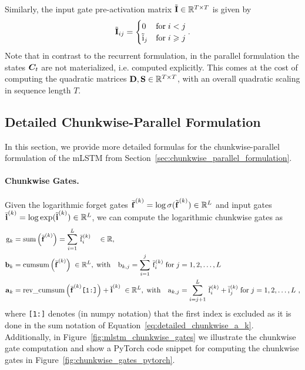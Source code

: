 \documentclass{article}
\begin{document}
    Similarly, the input gate pre-activation matrix $\tilde{\bm{\mathrm{I}}} \in \mathbb{R}^{T \times T}$ is given by
    \begin{equation}
        \tilde{\bm{\rI}}_{ij} = \begin{cases}
            0             & \text{for} \; i < j    \\ %
            \tilde{\Ri}_j & \text{for} \; i \geq j %
        \end{cases}.
    \end{equation}
    Note that in contrast to the recurrent formulation, in the parallel formulation the states $\bm{C}_{t}$ are not materialized, i.e. computed explicitly.
    This comes at the cost of computing the quadratic matrices $\bm{\mathrm{D}}, \bm{\mathrm{S}} \in \mathbb{R}^{T \times T}$, with an overall quadratic scaling in sequence length $T$.

    \subsection{Detailed Chunkwise-Parallel Formulation}
    \label{app:detailed_chunkwise_parallel_formulation}
    In this section, we provide more detailed formulas for the chunkwise-parallel formulation of the mLSTM from Section~\ref{sec:chunkwise_parallel_formulation}.

    \paragraph{Chunkwise Gates.} Given the logarithmic forget gates $\bar{\bm{\mathrm{f}}}^{(k)} = \log \sigma(\tilde{\bm{\mathrm{f}}}^{(k)}) \in \mathbb{R}^{L}$
    and input gates $\bar{\bm{\mathrm{i}}}^{(k)} = \log \exp (\tilde{\bm{\mathrm{i}}}^{(k)}) \in \mathbb{R}^{L}$,
    we can compute the logarithmic chunkwise gates as
    \begin{align}
        \mathrm{g}_k      & = \mathrm{sum} \left( \bar{\bm{\mathrm{f}}}^{(k)} \right)  = \sum_{i=1}^{L} \, \bar{{\mathrm{f}}}^{(k)}_i \quad \in \mathbb{R},                                                                                                                   \\
        \bm{\mathrm{b}}_k & = \mathrm{cumsum} \left( \bar{\bm{\mathrm{f}}}^{(k)} \right) \; \in \mathbb{R}^L, \; \text{with} \quad {\mathrm{b}}_{k,j} = \sum_{i=1}^{j} \, \bar{{\mathrm{f}}}^{(k)}_i \; \text{for} \;  j=1,2,\dots,L                                                   \\
        \label{eq:detailed_chunkwise_a_k}
        \bm{\mathrm{a}}_k & = \mathrm{rev\_cumsum} \left( \bar{\bm{\mathrm{f}}}^{(k)}\texttt{[1:]} \right) + \bar{\bm{\mathrm{i}}}^{(k)} \; \in \mathbb{R}^L, \; \text{with} \quad {\mathrm{a}}_{k,j} = \sum_{i=j+1}^{L} \, \bar{{\mathrm{f}}}^{(k)}_i + \bar{\mathrm{i}}^{(k)}_j \; \text{for} \;  j=1,2,\dots,L \ , 
    \end{align}
    where \texttt{[1:]} denotes (in numpy notation) that the first index is excluded as it is done in the sum notation of Equation~\eqref{eq:detailed_chunkwise_a_k}.
    Additionally, in Figure~\ref{fig:mlstm_chunkwise_gates} we illustrate the chunkwise gate computation and show a PyTorch code snippet for computing the chunkwise gates in Figure~\ref{fig:chunkwise_gates_pytorch}.
    
\end{document}
